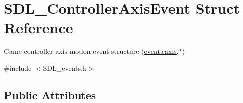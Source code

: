 \hypertarget{struct_s_d_l___controller_axis_event}{}\section{S\+D\+L\+\_\+\+Controller\+Axis\+Event Struct Reference}
\label{struct_s_d_l___controller_axis_event}


Game controller axis motion event structure (\hyperlink{union_s_d_l___event_aa8f6df0f2716fae56204b12ab4a4c289}{event.\+caxis}.$\ast$)  




{\ttfamily \#include $<$S\+D\+L\+\_\+events.\+h$>$}

\subsection*{Public Attributes}
